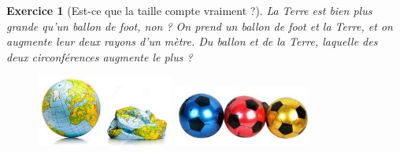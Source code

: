 \documentclass[12pt]{article}
\theoremstyle{break}
\newtheorem{exo}{Exercice}
\begin{document}
\begin{exo}[Est-ce que la taille compte vraiment ?]
La Terre est bien plus grande qu'un ballon de foot, non ? On prend un ballon de foot et la Terre, et on augmente leur deux rayons d'un mètre. Du ballon et de la Terre, laquelle des deux circonférences augmente le plus ?

\begin{figure}[h!]
	\centering
    \includegraphics[width=0.4\textwidth]{Terre.jpg}
    \includegraphics[width=0.4\textwidth]{BallonFoot.jpg}
\end{figure}
\end{exo}
\end{document}
